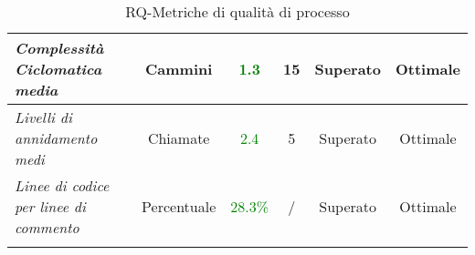 \begin{longtable}{|>{\centering}m{5cm}|c|c|c|c|c|}
\emph{Complessità Ciclomatica media} & {Cammini} & \textcolor{Green}{1.3} & 15 & Superato & Ottimale\\ \hline
\emph{Livelli di annidamento medi} & {Chiamate} & \textcolor{Green}{2.4} & 5 & Superato & Ottimale\\ \hline
\emph{Linee di codice per linee di commento} & {Percentuale} & \textcolor{Green}{28.3\%} & / & Superato & Ottimale\\ \hline
\caption{RQ-Metriche di qualità di processo}
\end{longtable}

